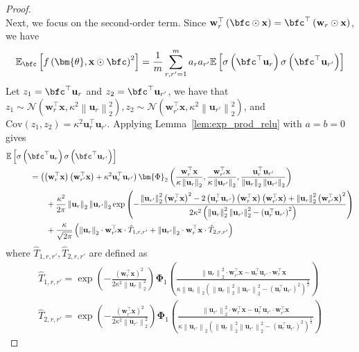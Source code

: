 \documentclass[10pt]{article} %
\theoremstyle{definition}
\theoremstyle{plain}
\newcommand{\paren}[1]{\left(#1\right)}
\newcommand{\norm}[1]{\left\|#1\right\|}
\providecommand{\E}{\mathbb{E}}
\def\bfu{{\mathbf{u}}}\def\bfv{{\mathbf{v}}}\def\bfw{{\mathbf{w}}}\def\bfx{{\mathbf{x}}}
\begin{document}
\begin{proof}
\begin{equation}
    \end{equation}
    Next, we focus on the second-order term. Since $\bfw_r^\top\paren{\bfc\odot\bfx} = \bfc^\top\paren{\bfw_r\odot\bfx}$, we have
    \[
        \E_{\bfc}\left[f\paren{\bm{\theta},\bfx\odot\bfc}^2\right] = \frac{1}{m}\sum_{r,r'=1}^ma_ra_{r'}\E\left[\sigma\paren{\bfc^\top\bfu_r}\sigma\paren{\bfc^\top\bfu_{r'}}\right]
    \]
    Let $z_1 = \bfc^\top\bfu_r$ and $z_2 = \bfc^\top\bfu_{r'}$, we have that $z_1 \sim\mathcal{N}\paren{\bfw_r^\top\bfx,\kappa^2\norm{\bfu_r}_2^2}, z_2\sim\mathcal{N}\paren{\bfw_{r'}^\top\bfx,\kappa^2\norm{\bfu_{r'}}_2^2}$, and $\text{Cov}\paren{z_1,z_2} = \kappa^2\bfu_r^\top\bfu_{r'}$. Applying Lemma~\ref{lem:exp_prod_relu} with $a = b = 0$ gives
    \begin{align*}
        & \E\left[\sigma\paren{\bfc^\top\bfu_r}\sigma\paren{\bfc^\top\bfu_{r'}}\right]\\
        &\quad\quad\quad = \paren{\paren{\bfw_r^\top\bfx}\paren{\bfw_{r'}^\top\bfx} + \kappa^2\bfu_r^\top\bfu_{r'}}\bm{\Phi}_2\paren{\frac{\bfw_r^\top\bfx}{\kappa\norm{\bfu_r}_2},\frac{\bfw_{r'}^\top\bfx}{\kappa\norm{\bfu_{r'}}_2},\frac{\bfu_r^\top\bfu_{r'}}{\norm{\bfu_r}_2\norm{\bfu_{r'}}_2}}\\
        &\quad\quad\quad\quad\quad  + \frac{\kappa^2}{2\pi}\norm{\bfu_r}_2\norm{\bfu_{r'}}_2\exp\paren{-\frac{\norm{\bfu_{r'}}_2^2\paren{\bfw_r^\top\bfx}^2-2\paren{\bfu_r^\top\bfu_{r'}}\paren{\bfw_r^\top\bfx}\paren{\bfw_{r'}^\top\bfx} + \norm{\bfu_r}_2^2\paren{\bfw_{r'}^\top\bfx}^2}{2\kappa^2\paren{\norm{\bfu_r}_2^2\norm{\bfu_{r'}}_2^2-\paren{\bfu_r^\top\bfu_{r'}}^2}}}\\
        & \quad\quad\quad\quad\quad  + \frac{\kappa}{\sqrt{2\pi}}\paren{\norm{\bfu_r}_2\cdot\bfw_{r'}^\top\bfx \cdot \hat{T}_{1,r,r'} + \norm{\bfu_{r'}}_2\cdot\bfw_{r}^\top\bfx \cdot \hat{T}_{2,r,r'}}
    \end{align*}
    where $\hat{T}_{1,r,r'}, \hat{T}_{2,r,r'}$ are defined as
    \begin{align*}
        \hat{T}_{1,r,r'} = \exp\paren{-\frac{\paren{\bfw_r^\top\bfx}^2}{2\kappa^2\norm{\bfu_r}_2^2}}\bm{\Phi}_1\paren{\frac{\norm{\bfu_r}_2^2\cdot\bfw_{r'}^\top\bfx-\bfu_r^\top\bfu_{r'}\cdot\bfw_r^\top\bfx}{\kappa\norm{\bfu_r}_2\paren{\norm{\bfu_r}_2^2\norm{\bfu_{r'}}_2^2-\paren{\bfu_r^\top\bfu_{r'}}^2}^{\frac{1}{2}}}}\\
        \hat{T}_{2,r,r'} = \exp\paren{-\frac{\paren{\bfw_{r'}^\top\bfx}^2}{2\kappa^2\norm{\bfu_{r'}}_2^2}}\bm{\Phi}_1\paren{\frac{\norm{\bfu_{r'}}_2^2\cdot\bfw_{r}^\top\bfx-\bfu_r^\top\bfu_{r'}\cdot\bfw_{r'}^\top\bfx}{\kappa\norm{\bfu_{r'}}_2\paren{\norm{\bfu_r}_2^2\norm{\bfu_{r'}}_2^2-\paren{\bfu_r^\top\bfu_{r'}}^2}^{\frac{1}{2}}}}

\end{align*}
\end{proof}
\end{document}
